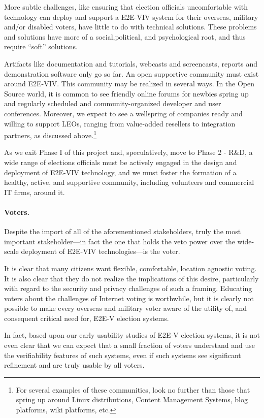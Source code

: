 More subtle challenges, like ensuring that election officials
uncomfortable with technology can deploy and support a E2E-VIV system
for their overseas, military and/or disabled voters, have little to 
do with technical solutions. These problems and solutions have more 
of a social,political, and psychological root, and thus require 
``soft'' solutions.

Artifacts like documentation and tutorials, webcasts and screencasts,
reports and demonstration software only go so far. An open supportive
community must exist around E2E-VIV.  This community may be realized
in several ways.  In the Open Source world, it is common to see
friendly online forums for newbies spring up and regularly scheduled
and community-organized developer and user conferences.  Moreover, we
expect to see a wellspring of companies ready and willing to support
LEOs, ranging from value-added resellers to integration partners, as
discussed above.\footnote{For several examples of these communities,
  look no further than those that spring up around Linux
  distributions, Content Management Systems, blog platforms, wiki
  platforms, etc.}
  
As we exit Phase I of this project and, speculatively, move to Phase
2 - R&D, a wide range of elections officials must be actively engaged in
the design and deployment of E2E-VIV technology, and we must foster
the formation of a healthy, active, and supportive community,
including volunteers and commercial IT firms, around it.

\paragraph{Voters.} Despite the import of all of the aforementioned
stakeholders, truly the most important stakeholder---in fact the one
that holds the veto power over the wide-scale deployment of E2E-VIV
technologies---is the voter.

It is clear that many citizens want flexible, comfortable, location
agnostic voting.  It is also clear that they do not realize the
implications of this desire, particularly with regard to the security
and privacy challenges of such a framing.  Educating voters about the
challenges of Internet voting is worthwhile, but it is clearly not
possible to make every overseas and military voter aware of the utility 
of, and consequent critical need for, E2E-V election systems.

In fact, based upon our early usability studies of E2E-V election
systems, it is not even clear that we can expect that a small fraction
of voters understand and use the verifiability features of such
systems, even if such systems see significant refinement and are
truly usable by all voters.

